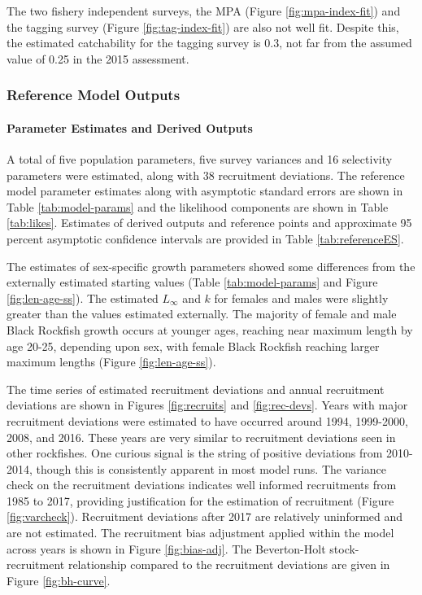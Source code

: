 \documentclass[11pt,
  english,
  letterpaper,
]{article}
\begin{document}
The two fishery independent surveys, the MPA (Figure \ref{fig:mpa-index-fit}) and the tagging survey (Figure \ref{fig:tag-index-fit}) are also not well fit. Despite this, the estimated catchability for the tagging survey is 0.3, not far from the assumed value of 0.25 in the 2015 assessment.

\hypertarget{reference-model-outputs}{%
\subsubsection{Reference Model Outputs}\label{reference-model-outputs}}

\hypertarget{parameter-estimates-and-derived-outputs}{%
\paragraph{Parameter Estimates and Derived Outputs}\label{parameter-estimates-and-derived-outputs}}

A total of five population parameters, five survey variances and 16 selectivity parameters were estimated, along with 38 recruitment deviations. The reference model parameter estimates along with asymptotic standard errors are shown in Table \ref{tab:model-params} and the likelihood components are shown in Table \ref{tab:likes}. Estimates of derived outputs and reference points and approximate 95 percent asymptotic confidence intervals are provided in Table \ref{tab:referenceES}.

The estimates of sex-specific growth parameters showed some differences from the externally estimated starting values (Table \ref{tab:model-params} and Figure \ref{fig:len-age-ss}). The estimated \(L_{\infty}\) and \(k\) for females and males were slightly greater than the values estimated externally. The majority of female and male Black Rockfish growth occurs at younger ages, reaching near maximum length by age 20-25, depending upon sex, with female Black Rockfish reaching larger maximum lengths (Figure \ref{fig:len-age-ss}).

The time series of estimated recruitment deviations and annual recruitment deviations are shown in Figures \ref{fig:recruits} and \ref{fig:rec-devs}. Years with major recruitment deviations were estimated to have occurred around 1994, 1999-2000, 2008, and 2016. These years are very similar to recruitment deviations seen in other rockfishes. One curious signal is the string of positive deviations from 2010-2014, though this is consistently apparent in most model runs. The variance check on the recruitment deviations indicates well informed recruitments from 1985 to 2017, providing justification for the estimation of recruitment (Figure \ref{fig:varcheck}). Recruitment deviations after 2017 are relatively uninformed and are not estimated. The recruitment bias adjustment applied within the model across years is shown in Figure \ref{fig:bias-adj}. The Beverton-Holt stock-recruitment relationship compared to the recruitment deviations are given in Figure \ref{fig:bh-curve}.
\end{document}
